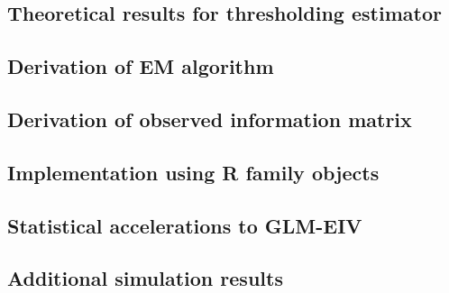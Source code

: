 \documentclass[12pt]{article}
\begin{document}
\subsection{Theoretical results for thresholding estimator}

\subsection{Derivation of EM algorithm}

\subsection{Derivation of observed information matrix}

\subsection{Implementation using R family objects}

\subsection{Statistical accelerations to GLM-EIV}

\subsection{Additional simulation results}



\newpage

\end{document}
